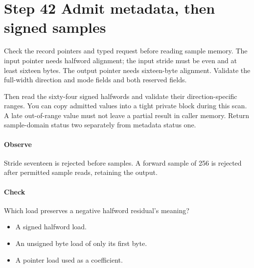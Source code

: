 \section{Step 42 Admit metadata, then signed samples}\label{h263-transform-s02}
Check the record pointers and typed request before reading sample memory.
The input pointer needs halfword alignment; the input stride must be even and
at least sixteen bytes. The output pointer needs sixteen-byte alignment.
Validate the full-width direction and mode fields and both reserved fields.

Then read the sixty-four signed halfwords and validate their direction-specific
ranges. You can copy admitted values into a tight private block during this scan.
A late out-of-range value must not leave a partial result in caller memory.
Return sample-domain status two separately from metadata status one.

\paragraph{Observe} Stride seventeen is rejected before samples. A forward
sample of 256 is rejected after permitted sample reads, retaining the output.
\paragraph{Check} Which load preserves a negative halfword residual's meaning?
\begin{itemize}
  \item[A.] A signed halfword load.
  \item[B.] An unsigned byte load of only its first byte.
  \item[C.] A pointer load used as a coefficient.
\end{itemize}
